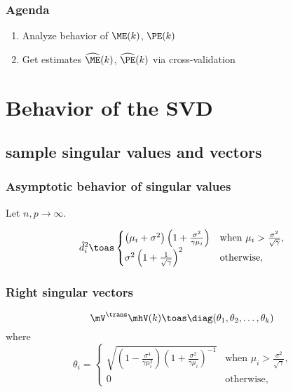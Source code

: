 \documentclass[14pt]{beamer}
\begin{document}
\begin{frame}
  \frametitle{Agenda}
  \begin{enumerate}
    \item Analyze behavior of $\ME(k)$, $\PE(k)$
    \item Get estimates $\widehat{\ME}(k)$, $\widehat{\PE}(k)$ via cross-validation
  \end{enumerate}
\end{frame}

\section{Behavior of the SVD}

\subsection{sample singular values and vectors}

\begin{frame}
  \frametitle{Asymptotic behavior of singular values}
  Let $n, p \to \infty$.
  \begin{theorem}[Onatski]
    \[
      \hat d_i^2
      \toas
        \begin{cases}
            \left( \mu_i + \sigma^2 \right)
            \left( 1 + \frac{\sigma^2}{\gamma \mu_i} \right)
                &\text{when $\mu_i > \frac{\sigma^2}{\sqrt{\gamma}}$}, \\
            \sigma^2 \left( 1 + \frac{1}{\sqrt{\gamma}} \right)^2
                &\text{otherwise,}
        \end{cases}
    \]
  \end{theorem} 
\end{frame}

\begin{frame}
  \frametitle{Right singular vectors}
  \begin{theorem}
    \[
      \mV^\trans \mhV(k)
      \toas
      \diag(\theta_1, \theta_2, \ldots, \theta_k)
    \]
    where
    \[
       \theta_i =  \begin{cases}
            \sqrt{ 
                \left( 1 - \frac{\sigma^4}{ \gamma \mu_i^2} \right) 
                \left( 1 + \frac{\sigma^2}{ \gamma \mu_i  } \right)^{-1} }
            &\text{when $\mu_i > \frac{\sigma^2}{\sqrt{\gamma}}$,} \\
            0
            &\text{otherwise,}
        \end{cases} 
    \]
  \end{theorem}
\end{frame}
\end{document}

